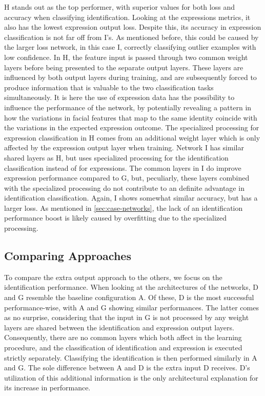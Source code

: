 \noindent H stands out as the top performer, with superior values for both loss and accuracy when classifying identification. Looking at the expressions metrics, it also has the lowest expression output loss. Despite this, its accuracy in expression classification is not far off from I's. As mentioned before, this could be caused by the larger loss network, in this case I, correctly classifying outlier examples with low confidence. In H, the feature input is passed through two common weight layers before being presented to the separate output layers. These layers are influenced by both output layers during training, and are subsequently forced to produce information that is valuable to the two classification tasks simultaneously. It is here the use of expression data has the possibility to influence the performance of the network, by potentially revealing a pattern in how the variations in facial features that map to the same identity coincide with the variations in the expected expression outcome. The specialized processing for expression classification in H comes from an additional weight layer which is only affected by the expression output layer when training. Network I has similar shared layers as H, but uses specialized processing for the identification classification instead of for expressions. The common layers in I do improve expression performance compared to G, but, peculiarly, these layers combined with the specialized processing do not contribute to an definite advantage in identification classification. Again, I shows somewhat similar accuracy, but has a larger loss. As mentioned in \autoref{sec:case-networks}, the lack of an identification performance boost is likely caused by overfitting due to the specialized processing. 

\subsection{Comparing Approaches}

To compare the extra output approach to the others, we focus on the identification performance. When looking at the architectures of the networks, D and G resemble the baseline configuration A. Of these, D is the most successful performance-wise, with A and G showing similar performances. The latter comes as no surprise, considering that the input in G is not processed by any weight layers are shared between the identification and expression output layers. Consequently, there are no common layers which both affect in the learning procedure, and the classification of identification and expression is executed strictly separately. Classifying the identification is then performed similarly in A and G. The sole difference between A and D is the extra input D receives. D's utilization of this additional information is the only architectural explanation for its increase in performance. \\

